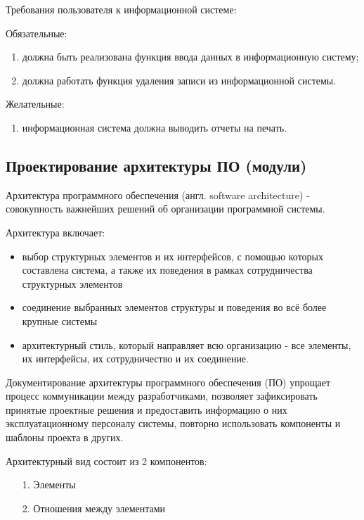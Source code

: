 Требования пользователя к информационной системе:

Обязательные:

\begin{enumerate}
    \item должна быть реализована функция ввода данных в информационную систему;
    \item должна работать функция удаления записи из информационной системы.
\end{enumerate}

Желательные:

\begin{enumerate}
    \item информационная система должна выводить отчеты на печать.
\end{enumerate}


\subsection{Проектирование архитектуры ПО (модули)}

Архитектура программного обеспечения (англ. software architecture) - совокупность
важнейших решений об организации программной системы.

Архитектура включает:

\begin{itemize}
    \item выбор структурных элементов и их интерфейсов, с помощью которых составлена система,
    а также их поведения в рамках сотрудничества структурных элементов
    \item соединение выбранных элементов структуры и поведения во всё более крупные системы
    \item архитектурный стиль, который направляет всю организацию - все элементы, их интерфейсы,
    их сотрудничество и их соединение.
\end{itemize}

Документирование архитектуры программного обеспечения (ПО) упрощает процесс коммуникации
между разработчиками, позволяет зафиксировать принятые проектные решения
и предоставить информацию о них эксплуатационному персоналу системы,
повторно использовать компоненты и шаблоны проекта в других.

Архитектурный вид состоит из 2 компонентов:

\begin{enumerate}
    \item [1.] Элементы
    \item [2.] Отношения между элементами
\end{enumerate}

